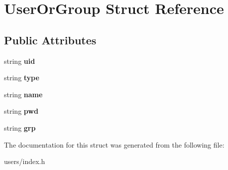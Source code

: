 \hypertarget{structUserOrGroup}{}\section{User\+Or\+Group Struct Reference}
\label{structUserOrGroup}
\subsection*{Public Attributes}
\begin{DoxyCompactItemize}
\item 
\mbox{\label{structUserOrGroup_a0e90e628f1aebf94b62b647b39890881}} 
string {\bfseries uid}
\item 
\mbox{\label{structUserOrGroup_a39ac76cda383b9db38845bc0903b84f5}} 
string {\bfseries type}
\item 
\mbox{\label{structUserOrGroup_ad5c8dbb858d34ae023b3e2addd511978}} 
string {\bfseries name}
\item 
\mbox{\label{structUserOrGroup_a95ab040240784fe1ed5f19612f834543}} 
string {\bfseries pwd}
\item 
\mbox{\label{structUserOrGroup_ad089ab60be3f1f00d68303f80dc0fe42}} 
string {\bfseries grp}
\end{DoxyCompactItemize}


The documentation for this struct was generated from the following file\+:\begin{DoxyCompactItemize}
\item 
users/index.\+h\end{DoxyCompactItemize}

